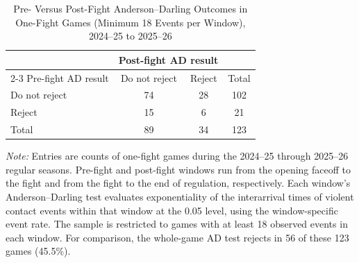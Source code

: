 \begin{table}[htbp]
\centering
\caption{Pre- Versus Post-Fight Anderson--Darling Outcomes in One-Fight Games (Minimum 18 Events per Window), 2024--25 to 2025--26}
\label{tab:one_fight_AD_rejection_min_18_20242025_20252026}
\small
\renewcommand{\arraystretch}{1.15}
\setlength{\tabcolsep}{6pt}

\begin{tabular*}{0.78\textwidth}{@{\extracolsep{\fill}}lccc}
\toprule
 & \multicolumn{2}{c}{Post-fight AD result} & \\
\cmidrule(lr){2-3}
Pre-fight AD result & Do not reject & Reject & Total \\
\midrule
Do not reject & 74 & 28 & 102 \\
Reject & 15 & 6 & 21 \\
\midrule
Total & 89 & 34 & 123 \\
\bottomrule
\end{tabular*}

\vspace{0.4em}
\parbox{0.78\textwidth}{
\footnotesize
\textit{Note:} Entries are counts of one-fight games during the 2024--25 through 2025--26 regular seasons. Pre-fight and post-fight windows run from the opening faceoff to the fight and from the fight to the end of regulation, respectively. Each window's Anderson--Darling test evaluates exponentiality of the interarrival times of violent contact events within that window at the 0.05 level, using the window-specific event rate. The sample is restricted to games with at least 18 observed events in each window. For comparison, the whole-game AD test rejects in 56 of these 123 games (45.5\%).
}
\end{table}
